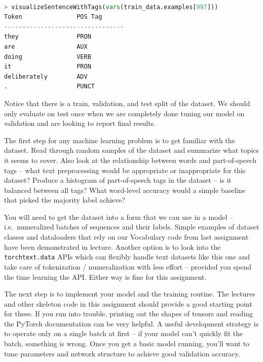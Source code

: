 \documentclass[a4paper,10pt]{article}
\begin{document}
\begin{center}
\begin{minipage}{0.8\textwidth}
\begin{lstlisting}[language=Python, caption=Visualizing a sentence and its associated list of tags.]

> visualizeSentenceWithTags(vars(train_data.examples[997]))
Token               POS Tag
---------------------------------
they                PRON
are                 AUX
doing               VERB
it                  PRON
deliberately        ADV
.                   PUNCT
\end{lstlisting}
\end{minipage}
\end{center}

\noindent Notice that there is a train, validation, and test split of the dataset. We should only evaluate on test once when we are completely done tuning our model on validation and are looking to report final results. 

\vspace{5pt}
\begin{taskbox}
 The first step for any machine learning problem is to get familiar with the dataset. Read through random samples of the dataset and summarize what topics it seems to cover. Also look at the relationship between words and part-of-speech tags -- what text preprocessing would be appropriate or inappropriate for this dataset? Produce a histogram of part-of-speech tags in the dataset -- is it balanced between all tags? What word-level accuracy would a simple baseline that  picked the majority label achieve?
\end{taskbox}
\vspace{5pt}


You will need to get the dataset into a form that we can use in a model -- i.e.~numeralized batches of sequences and their labels. Simple examples of dataset classes and dataloaders that rely on our Vocabulary code from last assignment have been demonstrated in lecture. Another option is to look into the \texttt{torchtext.data} APIs which can flexibly handle text datasets like this one and take care of tokenization / numeralization with less effort -- provided you spend the time learning the API. Either way is fine for this assignment.

The next step is to implement your model and the training routine. The lectures and other skeleton code in this assignment should provide a good starting point for these. If you run into trouble, printing out the shapes of tensors and reading the PyTorch documentation can be very helpful. A useful development strategy is to operate only on a single batch at first -- if your model can't quickly fit the batch, something is wrong. Once you get a basic model running, you'll want to tune parameters and network structure to achieve good validation accuracy. 
\end{document}
